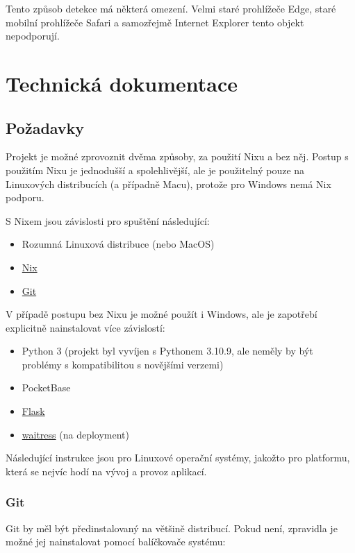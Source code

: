 \documentclass[11pt,a4paper,twoside,openright]{report}
\begin{document}
Tento způsob detekce má některá omezení. Velmi staré prohlížeče Edge, staré mobilní prohlížeče Safari a
samozřejmě Internet Explorer tento objekt nepodporují.

\chapter{Technická dokumentace}

\section{Požadavky}
Projekt je možné zprovoznit dvěma způsoby, za použití Nixu a bez něj. Postup s použitím Nixu je jednodušší a spolehlivější,
ale je použitelný pouze na Linuxových distribucích (a případně Macu), protože pro Windows nemá Nix podporu.

S Nixem jsou závislosti pro spuštění následující:

\begin{itemize}
  \item Rozumná Linuxová distribuce (nebo MacOS)
  \item \href{https://nixos.org/}{Nix}
  \item \href{https://git-scm.com/}{Git}
\end{itemize}

V případě postupu bez Nixu je možné použít i Windows, ale je zapotřebí explicitně nainstalovat více závislostí:

\begin{itemize}
\item Python 3 (projekt byl vyvíjen s Pythonem 3.10.9, ale neměly by být problémy s kompatibilitou s novějšími verzemi)
\item PocketBase
\item \href{https://flask.palletsprojects.com/en/2.2.x/}{Flask}
\item \href{https://pypi.org/project/waitress/}{waitress} (na deployment)
\end{itemize}

Následující instrukce jsou pro Linuxové operační systémy, jakožto pro platformu, která se nejvíc hodí
na vývoj a provoz aplikací.

\subsection{Git}
Git by měl být předinstalovaný na většině distribucí. Pokud není, zpravidla je možné jej
nainstalovat pomocí balíčkovače systému:
\end{document}
